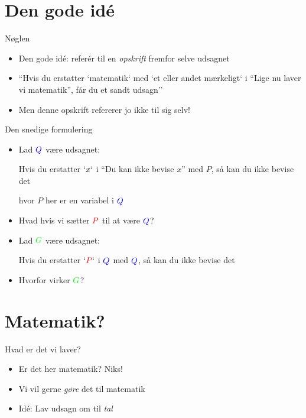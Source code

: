 \documentclass{beamer}
\begin{document}
\section{Den gode idé}
\begin{frame}{Nøglen}
  \begin{itemize}
    \item Den gode idé: referér til en \textit{opskrift} fremfor selve udsagnet
    \pause\item ``Hvis du erstatter `matematik` med `et eller andet mærkeligt` i ``Lige nu laver vi matematik'', får du et sandt udsagn''
    \pause\item Men denne opskrift refererer jo ikke til sig selv!
  \end{itemize}
\end{frame}

\begin{frame}{Den snedige formulering}
  \begin{itemize}
    \item Lad $\color{blue}Q$ være udsagnet:
    \begin{adjustwidth}{0.5cm}{0pt}
    {\small\color{darkgray}
      Hvis du erstatter $`x`$ i ``Du kan ikke bevise $x$'' med {\color{red}$P$}, så kan du ikke bevise det
    }
    \end{adjustwidth}
    hvor {\color{red} $P$} her er en variabel i $\color{blue} Q$
    \pause\item Hvad hvis vi sætter $\color{red} P$ til at være $\color{blue} Q$?
    \pause\item Lad $\color{green}G$ være udsagnet:
    \begin{adjustwidth}{0.5cm}{0pt}
    {\small\color{darkgray}
      Hvis du erstatter $`{\color{red}P}`$ i $\color{blue}Q$ med $\color{blue}Q$, så kan du ikke bevise det
    }
    \end{adjustwidth}
    \pause\item Hvorfor virker $\color{green}G$?
  \end{itemize}
\end{frame}

\section{Matematik?}
\begin{frame}{Hvad er det vi laver?}
  \begin{itemize}
    \item Er det her matematik? \pause Niks!
    \pause\item Vi vil gerne \textit{gøre} det til matematik
    \pause\item Idé: Lav udsagn om til \textit{tal}
  \end{itemize}
\end{frame}
\end{document}

